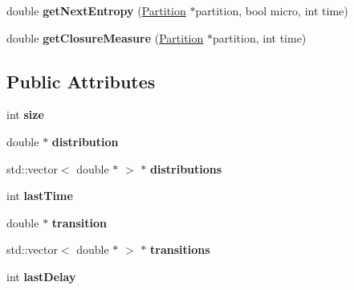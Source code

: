 \begin{DoxyCompactItemize}
\item 
\hypertarget{class_markov_process_a85b3be2d849c1b21ad1f98f06816ed76}{}double {\bfseries get\+Next\+Entropy} (\hyperlink{class_partition}{Partition} $\ast$partition, bool micro, int time)\label{class_markov_process_a85b3be2d849c1b21ad1f98f06816ed76}

\item 
\hypertarget{class_markov_process_a619919d687122a85e49368a5cf545a86}{}double {\bfseries get\+Closure\+Measure} (\hyperlink{class_partition}{Partition} $\ast$partition, int time)\label{class_markov_process_a619919d687122a85e49368a5cf545a86}

\end{DoxyCompactItemize}
\subsection*{Public Attributes}
\begin{DoxyCompactItemize}
\item 
\hypertarget{class_markov_process_ad38170c3a73d113dc152e73bc57d0523}{}int {\bfseries size}\label{class_markov_process_ad38170c3a73d113dc152e73bc57d0523}

\item 
\hypertarget{class_markov_process_ab08fd1641b1f866be6a7e3dcca7ed575}{}double $\ast$ {\bfseries distribution}\label{class_markov_process_ab08fd1641b1f866be6a7e3dcca7ed575}

\item 
\hypertarget{class_markov_process_a8e5ced320dd6b0a41c2f38f316c37cbf}{}std\+::vector$<$ double $\ast$ $>$ $\ast$ {\bfseries distributions}\label{class_markov_process_a8e5ced320dd6b0a41c2f38f316c37cbf}

\item 
\hypertarget{class_markov_process_a5eddf681cb7bc196a248813ba42b516f}{}int {\bfseries last\+Time}\label{class_markov_process_a5eddf681cb7bc196a248813ba42b516f}

\item 
\hypertarget{class_markov_process_aae914f9e4fa973b5515bebc41508a289}{}double $\ast$ {\bfseries transition}\label{class_markov_process_aae914f9e4fa973b5515bebc41508a289}

\item 
\hypertarget{class_markov_process_a16e4250dba911530aff3d2766a367e5b}{}std\+::vector$<$ double $\ast$ $>$ $\ast$ {\bfseries transitions}\label{class_markov_process_a16e4250dba911530aff3d2766a367e5b}

\item 
\hypertarget{class_markov_process_a5fa10a819200afd87b558332b6e351a6}{}int {\bfseries last\+Delay}\label{class_markov_process_a5fa10a819200afd87b558332b6e351a6}

\end{DoxyCompactItemize}


